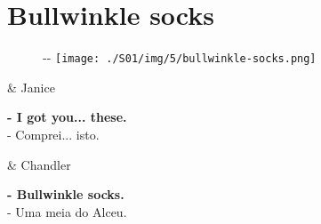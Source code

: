 \hypertarget{bullwinkle-socks}{%
\section{Bullwinkle socks}\label{bullwinkle-socks}}

\begin{figure}[!ht]
  \begin{adjustwidth}{-\oddsidemargin-1in}{-\rightmargin}
    \centering
    \texttt{[image: ./S01/img/5/bullwinkle-socks.png]}
  \end{adjustwidth}
\end{figure}

\begin{tcolorbox}[enhanced,center upper,
    drop fuzzy shadow southeast, boxrule=0.3pt,
    lower separated=false, breakable,
    colframe=black!30!dialogoBorder,colback=white]
\begin{minipage}[c]{0.16\linewidth}
   & \centering \scriptsize{Janice}
\end{minipage}
\hfill
\begin{minipage}[c]{0.8\linewidth}
  \textbf{- I got you... these.}\\
  - Comprei... isto.
\end{minipage}

\medskip
\begin{minipage}[c]{0.16\linewidth}
   & \centering \scriptsize{Chandler}
\end{minipage}
\hfill
\begin{minipage}[c]{0.8\linewidth}
  \textbf{- Bullwinkle socks.}\\
  - Uma meia do Alceu.
\end{minipage}
\end{tcolorbox}

